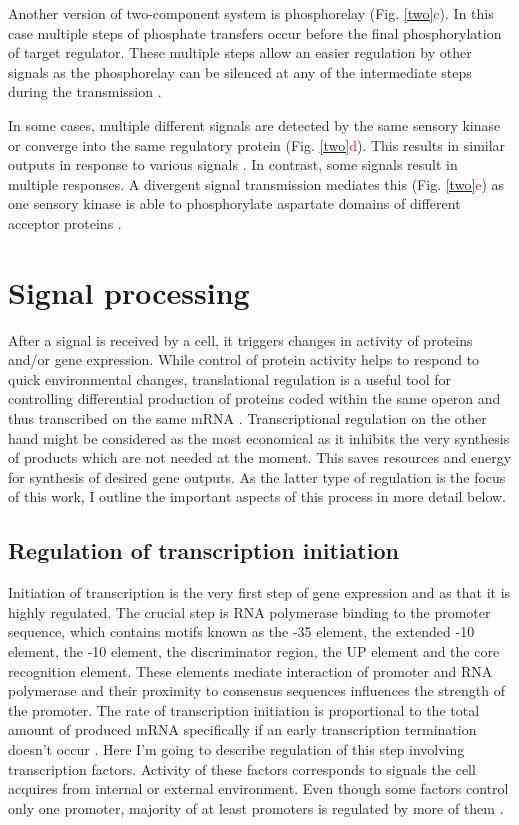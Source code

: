 Another version of two-component system is phosphorelay (Fig. \ref{two}\textcolor{red}{c}).
In this case multiple steps of phosphate transfers occur before the final phosphorylation of target regulator.
These multiple steps allow an easier regulation by other signals as the phosphorelay can be silenced at any of the intermediate steps during the transmission \cite{perego2001pentapeptide, groisman2016feedback}.

In some cases, multiple different signals are detected by the same sensory kinase or converge into the same regulatory protein (Fig. \ref{two}\textcolor{red}{d}).
This results in similar outputs in response to various signals \cite{kaczmarczyk2014complex, chambonnier2016hybrid}.
In contrast, some signals result in multiple responses.
A divergent signal transmission mediates this (Fig. \ref{two}\textcolor{red}{e}) as one sensory kinase is able to phosphorylate aspartate domains of different acceptor proteins \cite{mika2005two, groisman2016feedback}.

\section{Signal processing}
After a signal is received by a cell, it triggers changes in activity of proteins and/or gene expression.
While control of protein activity helps to respond to quick environmental changes, translational regulation is a useful tool for controlling differential production of proteins coded within the same operon and thus transcribed on the same mRNA \cite{dar2018extensive}.
Transcriptional regulation on the other hand might be considered as the most economical as it inhibits the very synthesis of products which are not needed at the moment.
This saves resources and energy for synthesis of desired gene outputs.
As the latter type of regulation is the focus of this work, I outline the important aspects of this process in more detail below.

\subsection{Regulation of transcription initiation}
Initiation of transcription is the very first step of gene expression and as that it is highly regulated.
The crucial step is RNA polymerase binding to the promoter sequence, which contains motifs known as the -35 element, the extended -10 element, the -10 element, the
discriminator region, the UP element and the core recognition element.
These elements mediate interaction of promoter and RNA polymerase and their proximity to consensus sequences influences the strength of the promoter.
The rate of transcription initiation is proportional to the total amount of produced mRNA specifically if an early transcription termination doesn't occur \cite{kennell1977transcription, iyer1996absolute}.
Here I'm going to describe regulation of this step involving transcription factors.
Activity of these factors corresponds to signals the cell acquires from internal or external environment.
Even though some factors control only one promoter, majority of at least  promoters is regulated by more of them \cite{karp2014ecocyc}.

